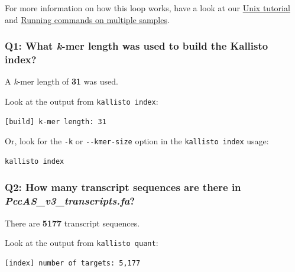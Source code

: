 \documentclass[11pt]{article}
\makeatletter
\newcommand{\boxspacing}{\kern\kvtcb@left@rule\kern\kvtcb@boxsep}
\newcommand{\prompt}[4]{
        {\ttfamily\llap{{\color{#2}[#3]:\hspace{3pt}#4}}\vspace{-\baselineskip}}
    }
\makeatother
\begin{document}
    For more information on how this loop works, have a look at our
\href{../Unix/index.ipynb}{Unix tutorial} and
\href{running-commands-on-multiple-samples.ipynb}{Running commands on
multiple samples}.

    \hypertarget{q1-what-k-mer-length-was-used-to-build-the-kallisto-index}{%
\subsubsection{\texorpdfstring{Q1: What \textit{k}-mer length was used to
build the Kallisto
index?}{Q1: What k-mer length was used to build the Kallisto index?}}\label{q1-what-k-mer-length-was-used-to-build-the-kallisto-index}}

A \textit{k}-mer length of \textbf{31} was used.

Look at the output from \texttt{kallisto\ index}:

\begin{verbatim}
[build] k-mer length: 31
\end{verbatim}

Or, look for the \texttt{-k} or \texttt{-\/-kmer-size} option in the
\texttt{kallisto\ index} usage:

    \begin{tcolorbox}[breakable, size=fbox, boxrule=1pt, pad at break*=1mm,colback=cellbackground, colframe=cellborder]
\prompt{In}{incolor}{ }{\boxspacing}
\begin{Verbatim}[commandchars=\\\{\}]
kallisto index
\end{Verbatim}
\end{tcolorbox}

    \hypertarget{q2-how-many-transcript-sequences-are-there-in-pccas_v3_transcripts.fa}{%
\subsubsection{\texorpdfstring{Q2: How many transcript sequences are
there in
\textit{PccAS\_v3\_transcripts.fa}?}{Q2: How many transcript sequences are there in PccAS\_v3\_transcripts.fa?}}\label{q2-how-many-transcript-sequences-are-there-in-pccas_v3_transcripts.fa}}

There are \textbf{5177} transcript sequences.

Look at the output from \texttt{kallisto\ quant}:

\begin{verbatim}
[index] number of targets: 5,177
\end{verbatim}
\end{document}
